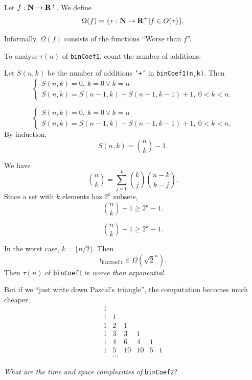 \documentclass{beamer}
\begin{document}
%
\begin{frame}{}
	\begin{defn}
		Let $f : \mathbf{N} \to \mathbf{R}^+$. We define
		\[
			\Omega(f)= \{\tau : \mathbf{N} \to \mathbf{R}^+ | f \in O(\tau)\}.
		\]
	\end{defn}
\end{frame}
%
\begin{frame}{}
	Informally, $\Omega(f)$ consists of the functions
	``Worse than $f$''.
\end{frame}
%
\begin{frame}{}
	To analyse $\tau(n)$ of \texttt{binCoef1}, count the number of
	additions:
\end{frame}
%
\begin{frame}{}
	Let $S(n,k)$ be the number of additions \texttt{'+'} in
	\texttt{binCoef1(n,k)}. Then
	\[
		\begin{cases}
			S(n,k) = 0,\ k = 0 \lor k = n\\
			S(n,k) = S(n-1,k) + S(n-1,k-1) + 1,\ 0 < k < n.
		\end{cases}
	\]
\end{frame}
%
\begin{frame}{}
	\[
		\begin{cases}
			S(n,k) = 0,\ k = 0 \lor k = n\\
			S(n,k) = S(n-1,k) + S(n-1,k-1) + 1,\ 0 < k < n.
		\end{cases}
	\]
	By induction,
		\[
			S(n,k) = \binom{n}{k} - 1.
		\] 
\end{frame}
%
\begin{frame}{}
	We have
	\[
		\binom{n}{k} = \sum_{j= 0}^k \binom{k}{j} \binom{n-k}{k-j}.
	\]\pause
	Since a set with $k$ elements has $2^k$ subsets,
	\[
		\binom{n}{k} - 1 \geq 2^k - 1.
	\]
\end{frame}
%
\begin{frame}{}
	\[
		\binom{n}{k} - 1 \geq 2^k - 1.
	\]
\end{frame}
%
\begin{frame}{}
	In the worst case, $k= \lfloor n/2 \rfloor$. Then 
	\[
		t_{\texttt{binCoef1}} \in \Omega(\sqrt{2}^n).
	\]
	Then $\tau(n)$ of \texttt{binCoef1} is \emph{worse than exponential}.
\end{frame}
%
\begin{frame}{}
	But if we ``just write down Pascal's triangle'', the
	computation becomes much cheaper.
	\[
		\begin{array}{cccccc}
			1 & & & & & \\
			1 & 1 & & & & \\ 
			1 & 2 & 1 & & & \\ 
			1 & 3 & 3 & 1 & & \\ 
			1 & 4 & 6 & 4 & 1 & \\ 
			1 & 5 & 10 & 10 & 5 & 1\\
			 & \cdots & & & & 
		\end{array}
	\]
\end{frame}
%
\begin{frame}{}
	
\end{frame}
%
\begin{frame}{}
	\emph{What are the time and space complexities of} \texttt{binCoef2}?
\end{frame}
\end{document}
